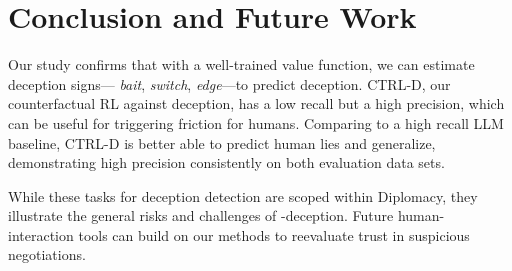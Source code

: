 \section{Conclusion and Future Work}
Our study confirms that with a well-trained value function, we can estimate deception signs--- \emph{bait}, \emph{switch}, \emph{edge}---to predict deception. 
%
CTRL-D, our counterfactual RL against deception, has a low recall but a high precision, which can be useful for triggering friction for humans.
%
Comparing to a high recall LLM baseline, CTRL-D is better able to predict human lies and generalize, demonstrating high precision consistently on both evaluation data sets. 

While these tasks for deception detection are scoped within Diplomacy, they illustrate the general risks and challenges of -deception. 
%
Future human- interaction tools can build on our methods to reevaluate trust in suspicious negotiations.